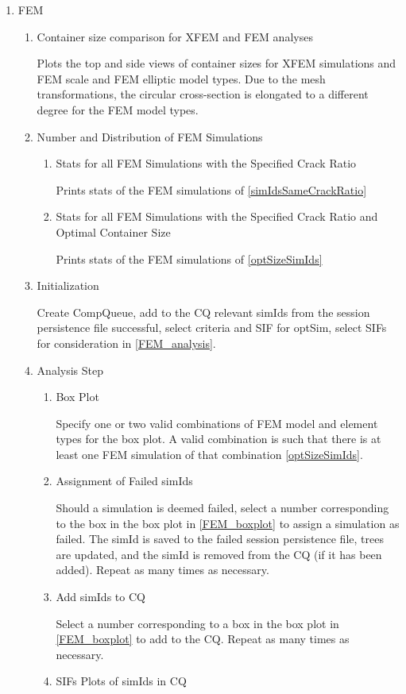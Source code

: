 \documentclass[10pt,a4paper]{article}
\begin{document}
\begin{enumerate}
\begin{enumerate}
\item FEM
\begin{enumerate}
\item Container size comparison for XFEM and FEM analyses

Plots the top and side views of container sizes for XFEM simulations and FEM scale and FEM elliptic model types. Due to the mesh transformations, the circular cross-section is elongated to a different degree for the FEM model types.
\item Number and Distribution of FEM Simulations
\begin{enumerate}
\item Stats for all FEM Simulations with the Specified Crack Ratio

Prints stats of the FEM simulations of \ref{simIdsSameCrackRatio}
\item Stats for all FEM Simulations with the Specified Crack Ratio and Optimal Container Size

Prints stats of the FEM simulations of \ref{optSizeSimIds}
\end{enumerate}
\item Initialization

Create CompQueue, add to the CQ relevant simIds from the session persistence file successful, select criteria and SIF for optSim, select SIFs for consideration in \ref{FEM_analysis}.
\item Analysis Step\label{FEM_analysis}
\begin{enumerate}
\item Box Plot\label{FEM_boxplot}

Specify one or two valid combinations of FEM model and element types for the box plot. A valid combination is such that there is at least one FEM  simulation of that combination \ref{optSizeSimIds}.
\item Assignment of Failed simIds

Should a simulation is deemed failed, select a number corresponding to the box in the box plot in \ref{FEM_boxplot} to assign a simulation as failed. The simId is saved to the failed session persistence file, trees are updated, and the simId is removed from the CQ (if it has been added). Repeat as many times as necessary.
\item Add simIds to CQ

Select a number corresponding to a box in the box plot in \ref{FEM_boxplot} to add to the CQ. Repeat as many times as necessary.
\item SIFs Plots of simIds in CQ


\end{enumerate}
\end{enumerate}
\end{enumerate}
\end{enumerate}
\end{document}
